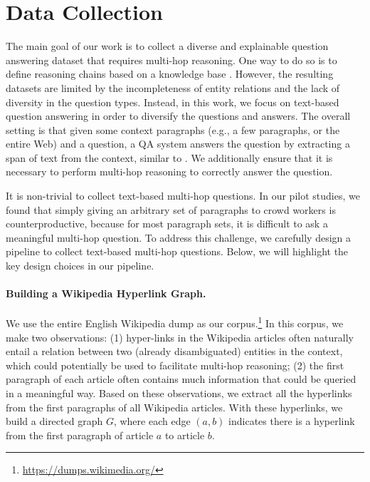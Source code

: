 \section{Data Collection} \label{sec:collect}


The main goal of our work is to collect a diverse and explainable question answering dataset that requires multi-hop reasoning.
One way to do so is to define reasoning chains based on a knowledge base \cite{welbl2017constructing,talmor2018web}.
However, the resulting datasets are limited by the incompleteness of entity relations and the lack of diversity in the question types.
Instead, in this work, we focus on text-based question answering in order to diversify the questions and answers.
The overall setting is that given some context paragraphs (e.g., a few paragraphs, or the entire Web) and a question, a QA system answers the question by extracting a span of text from the context, similar to \citet{rajpurkar2016squad}.
We additionally ensure that it is necessary to perform multi-hop reasoning to correctly answer the question.

It is non-trivial to collect text-based multi-hop questions.
In our pilot studies, we found that simply giving an arbitrary set of paragraphs to crowd workers is counterproductive, because for most paragraph sets, it is difficult to ask a meaningful multi-hop question.
To address this challenge, we carefully design a pipeline to collect text-based multi-hop questions.
Below, we will highlight the key design choices in our pipeline.

\paragraph{Building a Wikipedia Hyperlink Graph.}
We use the entire English Wikipedia dump as our corpus.\footnote{\url{https://dumps.wikimedia.org/}}
In this corpus, we make two observations:
(1) hyper-links in the Wikipedia articles often naturally entail a relation between two (already disambiguated) entities in the context, which could potentially be used to facilitate multi-hop reasoning;
(2) the first paragraph of each article often contains much information that could be queried in a meaningful way.
Based on these observations, we extract all the hyperlinks from the first paragraphs of all Wikipedia articles.
With these hyperlinks, we build a directed graph $G$, where each edge $(a, b)$ indicates there is a hyperlink from the first paragraph of article $a$ to article $b$.

